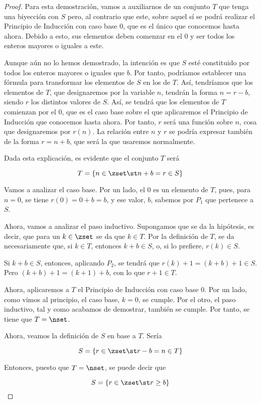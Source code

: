 \begin{proof}
  Para esta demostración, vamos a auxiliarnos de un conjunto $T$ que tenga
  una biyección con $S$ pero, al contrario que este, sobre aquel sí se podrá
  realizar el Principio de Inducción con caso base 0, que es el único que
  conocemos hasta ahora. Debido a esto, sus elementos deben comenzar en el 0
  y ser todos los enteros mayores o iguales a este.


  Aunque aún no lo hemos demostrado, la intención es que $S$ esté
  constituido por todos los enteros mayores o iguales que $b$. Por tanto,
  podríamos establecer una fórmula para transformar los elementos de $S$ en
  los de $T$. Así, tendríamos que los elementos de $T$, que designaremos por
  la variable $n$, tendrán la forma $n = r - b$, siendo $r$ los distintos
  valores de $S$. Así, se tendrá que los elementos de $T$ comienzan por el
  0, que es el caso base sobre el que aplicaremos el Principio de Inducción
  que conocemos hasta ahora. Por tanto, $r$ será una función sobre $n$, cosa
  que designaremos por $r(n)$. La relación entre $n$ y $r$ se podría
  expresar también de la forma $r = n + b$, que será la que usaremos
  normalmente.

  Dada esta explicación, es evidente que el conjunto $T$ será

  $$ T = \{n \in \zset \st n + b = r \in S\} $$

  Vamos a analizar el caso base. Por un lado, el 0 es un elemento de $T$,
  pues, para $n = 0$, se tiene $r(0) = 0 + b = b$, y ese valor, $b$, sabemos
  por $P_1$ que pertenece a $S$.

  Ahora, vamos a analizar el paso inductivo. Supongamos que se da la
  hipótesis, es decir, que para un $k \in \zset$ se da que $k \in T$. Por la
  definición de $T$, se da necesariamente que, si $k \in T$, entonces $k + b
  \in S$, o, si lo prefiere, $r(k) \in S$.

  Si $k + b \in S$, entonces, aplicando $P_2$, se tendrá que $r(k) + 1 = (k
  + b) + 1 \in S$. Pero $(k + b) + 1 = (k + 1) + b$, con lo que $r + 1 \in
  T$.

  Ahora, aplicaremos a $T$ el Principio de Inducción con caso base 0. Por un
  lado, como vimos al principio, el caso base, $k = 0$, se cumple. Por el
  otro, el paso inductivo, tal y como acabamos de demostrar, también se
  cumple. Por tanto, se tiene que $T = \nset$.

  Ahora, veamos la definición de $S$ en base a $T$. Sería

  $$ S = \{r \in \zset \st r - b = n \in T\} $$

  Entonces, puesto que $T = \nset$, se puede decir que

  $$ S = \{r \in \zset \st r \geq b\} $$

\end{proof}

